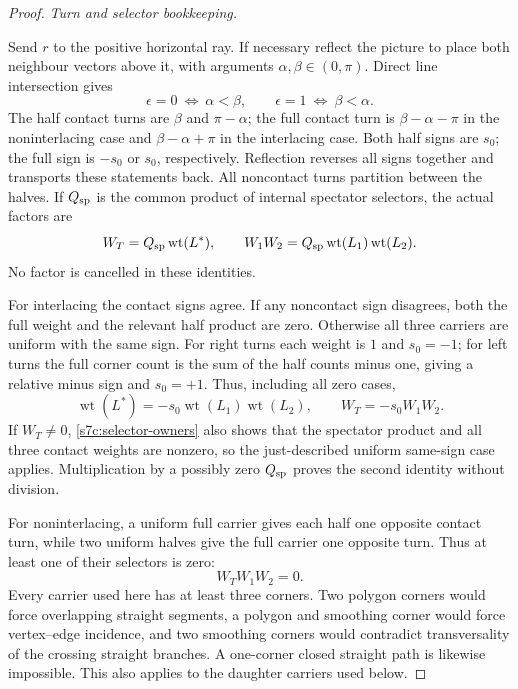 \begin{proof}
\par\medskip\noindent\emph{Turn and selector bookkeeping.}\par

Send $r$ to the positive horizontal ray.  If necessary reflect the
picture to place both neighbour vectors above it, with arguments
$\alpha,\beta\in(0,\pi)$.  Direct line intersection gives
\begin{equation}\label{s7c:angle-orders}
 \epsilon=0\ \Longleftrightarrow\ \alpha<\beta,
 \qquad
 \epsilon=1\ \Longleftrightarrow\ \beta<\alpha.
\end{equation}
The half contact turns are $\beta$ and $\pi-\alpha$; the full
contact turn is $\beta-\alpha-\pi$ in the noninterlacing case and
$\beta-\alpha+\pi$ in the interlacing case.  Both half signs are
$s_0$; the full sign is $-s_0$ or $s_0$, respectively.  Reflection
reverses all signs together and transports these statements back.
All noncontact turns partition between the halves.  If $Q_{\rm sp}$
is the common product of internal spectator selectors, the actual factors
are
\begin{equation}\label{s7c:selector-owners}
 W_T=Q_{\rm sp}\operatorname{wt}(L^*),\qquad
 W_1W_2=Q_{\rm sp}\operatorname{wt}(L_1)\operatorname{wt}(L_2).
\end{equation}
No factor is cancelled in these identities.

For interlacing the contact signs agree.  If any noncontact sign disagrees,
both the full weight and the relevant half product are zero.  Otherwise
all three carriers are uniform with the same sign.  For right turns each
weight is $1$ and $s_0=-1$; for left turns the full corner count is the
sum of the half counts minus one, giving a relative minus sign and
$s_0=+1$.  Thus, including all zero cases,
\begin{equation}\label{s7c:interlacing-selector}
 \operatorname{wt}(L^*)=-s_0\operatorname{wt}(L_1)
                       \operatorname{wt}(L_2),\qquad
 W_T=-s_0 W_1W_2.
\end{equation}
If $W_T\ne0$, \eqref{s7c:selector-owners} also shows that the spectator
product and all three contact weights are nonzero, so the just-described
uniform same-sign case applies.  Multiplication by a possibly zero
$Q_{\rm sp}$ proves the second identity without division.

For noninterlacing, a uniform full carrier gives each half one opposite
contact turn, while two uniform halves give the full carrier one opposite
turn.  Thus at least one of their selectors is zero:
\begin{equation}\label{s7c:noninterlacing-selector}
 W_T W_1W_2=0.
\end{equation}
Every carrier used here has at least three corners.  Two polygon corners
would force overlapping straight segments, a polygon and smoothing corner
would force vertex--edge incidence, and two smoothing corners would
contradict transversality of the crossing straight branches.  A one-corner
closed straight path is likewise impossible.  This also applies to the
daughter carriers used below.


\end{proof}
